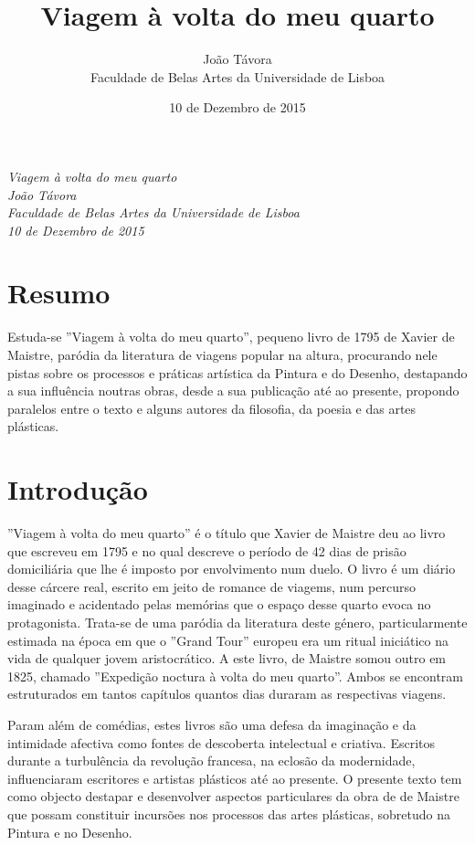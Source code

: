 \documentclass[12pt]{article}
\title{Viagem à volta do meu quarto}
\date{10 de Dezembro de 2015}
\author{João Távora \\Faculdade de Belas Artes da Universidade de Lisboa}
\begin{document}

\emph{Viagem à volta do meu quarto}\\
\emph{João Távora}\\
\emph{Faculdade de Belas Artes da Universidade de Lisboa}\\
\emph{10 de Dezembro de 2015}\\

\section{Resumo}

Estuda-se ''Viagem à volta do meu quarto'', pequeno livro de 1795 de
Xavier de Maistre, paródia da literatura de viagens popular na altura,
procurando nele pistas sobre os processos e práticas artística da
Pintura e do Desenho, destapando a sua influência noutras obras, desde
a sua publicação até ao presente, propondo paralelos entre o texto e
alguns autores da filosofia, da poesia e das artes plásticas.

\section{Introdução}

''Viagem à volta do meu quarto'' é o título que Xavier de Maistre deu
ao livro que escreveu em 1795 e no qual descreve o período de 42 dias
de prisão domiciliária que lhe é imposto por envolvimento num duelo. O
livro é um diário desse cárcere real, escrito em jeito de romance de
viagems, num percurso imaginado e acidentado pelas memórias que o
espaço desse quarto evoca no protagonista. Trata-se de uma paródia da
literatura deste género, particularmente estimada na época em que o
''Grand Tour'' europeu era um ritual iniciático na vida de qualquer
jovem aristocrático. A este livro, de Maistre somou outro em 1825,
chamado ''Expedição noctura à volta do meu quarto''. Ambos se
encontram estruturados em tantos capítulos quantos dias duraram as
respectivas viagens.

Param além de comédias, estes livros são uma defesa da imaginação e da
intimidade afectiva como fontes de descoberta intelectual e
criativa. Escritos durante a turbulência da revolução francesa, na
eclosão da modernidade, influenciaram escritores e artistas plásticos
até ao presente. O presente texto tem como objecto destapar e
desenvolver aspectos particulares da obra de de Maistre que possam
constituir incursões nos processos das artes plásticas, sobretudo na
Pintura e no Desenho.
\end{document}
